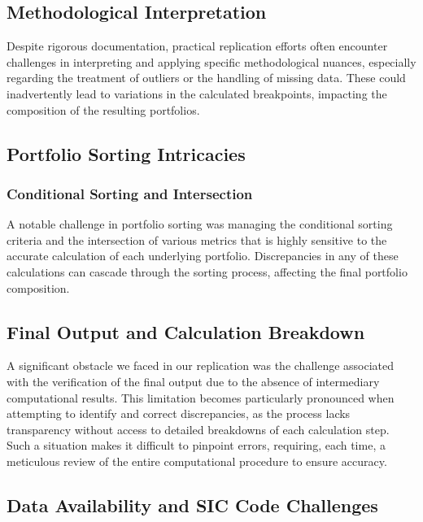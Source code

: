 \documentclass{article}
\begin{document}
\subsection*{Methodological Interpretation}

Despite rigorous documentation, practical replication efforts often encounter challenges in interpreting and applying specific methodological nuances, especially regarding the treatment of outliers or the handling of missing data. These could inadvertently lead to variations in the calculated breakpoints, impacting the composition of the resulting portfolios.

\subsection*{Portfolio Sorting Intricacies}

\subsubsection*{Conditional Sorting and Intersection}

A notable challenge in portfolio sorting was managing the conditional sorting criteria and the intersection of various metrics that is highly sensitive to the accurate calculation of each underlying portfolio. Discrepancies in any of these calculations can cascade through the sorting process, affecting the final portfolio composition.

\subsection*{Final Output and Calculation Breakdown}

A significant obstacle we faced in our replication was the challenge associated with the verification of the final output due to the absence of intermediary computational results. This limitation becomes particularly pronounced when attempting to identify and correct discrepancies, as the process lacks transparency without access to detailed breakdowns of each calculation step. Such a situation makes it difficult to pinpoint errors, requiring, each time, a meticulous review of the entire computational procedure to ensure accuracy.

\subsection*{Data Availability and SIC Code Challenges}
\end{document}
